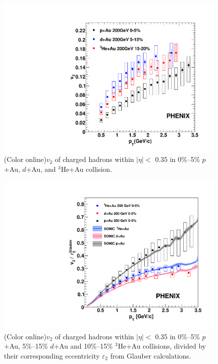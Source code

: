 \documentclass[%
reprint,
showpacs,preprintnumbers,
 amsmath,amssymb,
 aps,
]{revtex4-1}
\newcommand{\dau}{\mbox{$d$+Au}\xspace}
\newcommand{\pau}{\mbox{$p$+Au}\xspace}
\newcommand{\hau}{\mbox{$^3\text{He}$+Au}\xspace}
\begin{document}
\begin{figure}[htbp]
  \includegraphics[scale=0.45]{Figures/figure3.pdf}
  \caption{(Color online)$v_2$ of charged hadrons within $|\eta| <$ 0.35 in 0\%--5\% \pau, \dau, and \hau collision.}
\label{fig:figure3}
\end{figure}

\begin{figure}[htbp]
  \includegraphics[scale=0.45]{Figures/figure3_epsilon2ratio.pdf}
  \caption{(Color online)$v_2$ of charged hadrons within $|\eta| <$ 0.35 in 0\%--5\% \pau, 5\%--15\% \dau and 10\%--15\% \hau collisions, divided by their corresponding eccentricity $\varepsilon_2$ from Glauber calculations.}
\label{fig:figure3_epsilonratio}
\end{figure}
\end{document}
